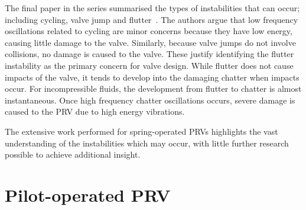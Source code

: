The final paper in the series summarised the types of instabilities that can occur; including cycling, valve jump and flutter~\cite{Hos2017DynamicRecommendations}.
The authors argue that low frequency oscillations related to cycling are minor concerns because they have low energy, causing little damage to the valve. Similarly, because valve jumps do not involve collisions, no damage is caused to the valve.
%
These justify identifying the flutter instability as the primary concern for valve design. While flutter does not cause impacts of the valve, it tends to develop into the damaging chatter when impacts occur. For incompressible fluids, the development from flutter to chatter is almost instantaneous. Once high frequency chatter oscillations occurs, severe damage is caused to the PRV due to high energy vibrations. %

The extensive work performed for spring-operated PRVs highlights the vast understanding of the  instabilities which may occur, with little further research possible to achieve additional insight.

\section{Pilot-operated PRV}


